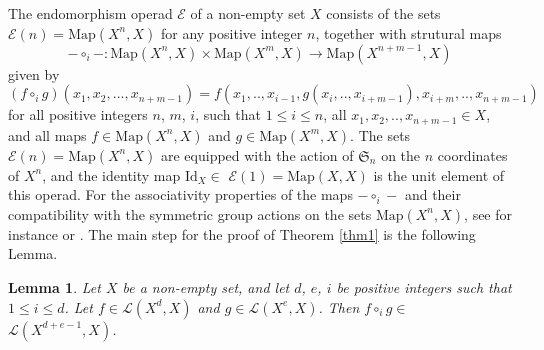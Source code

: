 \documentclass{amsart} %
\theoremstyle{plain}\newtheorem{Theorem}{Theorem}[section]
\theoremstyle{plain}\newtheorem{Conjecture}[Theorem]{Conjecture}
\theoremstyle{plain}\newtheorem{Corollary}[Theorem]{Corollary}
\theoremstyle{plain}\newtheorem{Lemma}[Theorem]{Lemma}
\theoremstyle{plain}\newtheorem{Proposition}[Theorem]{Proposition}
\theoremstyle{definition}\newtheorem{Definition}[Theorem]{Definition}
\theoremstyle{definition}\newtheorem{Example}[Theorem]{Example}
\theoremstyle{definition}\newtheorem{Examples}[Theorem]{Examples}
\theoremstyle{definition}\newtheorem{Remark}[Theorem]{Remark}
\theoremstyle{definition}\newtheorem{Remarks}[Theorem]{Remarks}
\theoremstyle{plain}\newtheorem{Statement}[Theorem]{}
\def\CE{{\mathcal{E}}}    \def\OR{{\mathcal{O}R}}
\def\CL{{\mathcal{L}}}  \def\bCL{{\mathbf{L}}}
\def\Id{\mathrm{Id}}             \def\tenA{\otimes_A}
\def\Map{\mathrm{Map}}
\def\sym{\mathfrak{S}} %
\begin{document}
The endomorphism operad $\CE$ of a non-empty set $X$ consists
of the sets $\CE(n) = \Map(X^n,X)$  for any positive integer $n$, 
together with strutural maps
$$-\circ_i - : \Map(X^n,X) \times \Map(X^m,X) \to \Map(X^{n+m-1},X)$$
given by
$$(f \circ_i g)(x_1,x_2,..., x_{n+m-1}) =
f(x_1,..,x_{i-1}, g(x_i,..,x_{i+m-1}), x_{i+m},..,x_{n+m-1})$$
for all positive integers $n$, $m$, $i$, such that $1\leq i\leq n$,  all
$x_1,x_2,..,x_{n+m-1}\in X$, and all maps $f\in \Map(X^n,X)$ and $g\in \Map(X^m,X)$. 
The sets $\CE(n)=\Map(X^n,X)$ are equipped with
the action of $\sym_n$ on the $n$ coordinates of $X^n$, and the identity map
$\Id_X\in$ $\CE(1)=\Map(X,X)$ is the unit element of this operad.
For the associativity properties of the maps $-\circ_i -$ and their compatibility with 
the symmetric group actions on the sets $\Map(X^n,X)$, see for instance 
\cite[Definition 1.2]{May72} or \cite[Part II,\S 1.2]{MarShnSta}.
The main step for the proof of Theorem \ref{thm1} is the following Lemma.

\begin{Lemma}  \label{Lem-closed}
Let $X$ be a non-empty set, and 
let $d$, $e$, $i$ be positive integers such that $1\leq i\leq d$. 
Let $f\in\CL(X^d,X)$ and $g\in\CL(X^e,X)$. 
Then $f\circ_i g\in$ $\CL(X^{d+e-1},X)$.
\end{Lemma}
\end{document}
